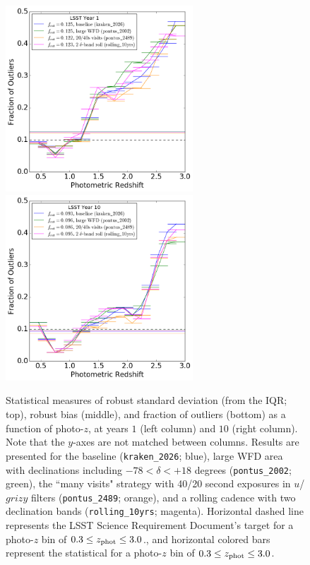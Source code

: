 \begin{figure}
\begin{center}
\includegraphics[width=7cm,trim={0cm 0cm 0cm 0cm},clip]{figures/year1_fout.png}
\includegraphics[width=7cm,trim={0cm 0cm 0cm 0cm},clip]{figures/year10_fout.png}
\caption{Statistical measures of robust standard deviation (from the IQR; top), robust bias (middle), and fraction of outliers (bottom) as a function of photo-$z$, at years $1$ (left column) and $10$ (right column). Note that the $y$-axes are not matched between columns. Results are presented for the baseline ({\tt kraken\_2026}; blue), large WFD area with declinations including  $-78<\delta<+18$ degrees ({\tt pontus\_2002}; green), the ``many visits" strategy with 40/20 second exposures in $u$/$grizy$ filters ({\tt pontus\_2489}; orange), and a rolling cadence with two declination bands ({\tt rolling\_10yrs}; magenta). Horizontal dashed line represents the LSST Science Requirement Document's target for a photo-$z$ bin of $0.3 \leq z_{\rm phot} \leq 3.0$., and horizontal colored bars represent the statistical for a photo-$z$ bin of $0.3 \leq z_{\rm phot} \leq 3.0$. \label{fig:stats_opsim}}
\end{center}
\end{figure}

